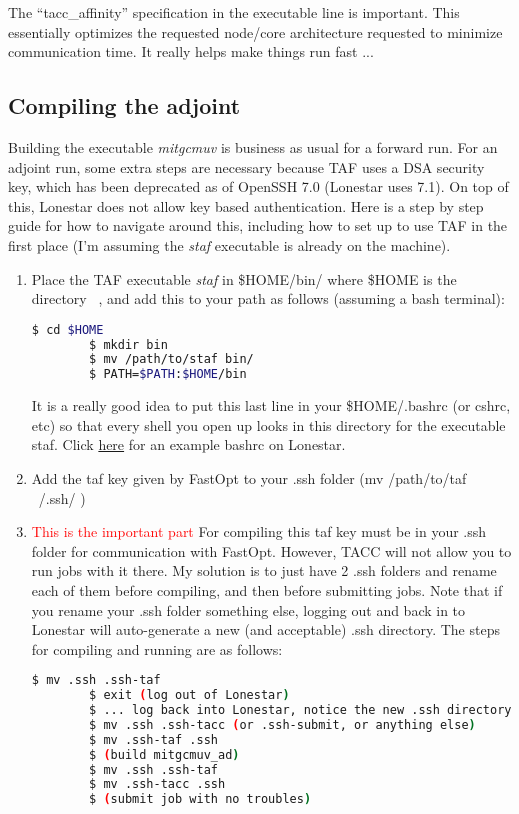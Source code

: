 \documentclass[a4paper,11pt]{article}
\newcommand{\red}[1]{\textcolor{red}{#1}}
\begin{document}
	The ``tacc\_affinity'' specification in the executable line is important. This essentially optimizes the requested node/core architecture requested to minimize communication time. It really helps make things run fast ...

	\subsection{Compiling the adjoint} 
	Building the executable \textit{mitgcmuv} is business as usual for a forward run. For an adjoint run, some extra steps are necessary because TAF uses a DSA security key, which has been deprecated as of OpenSSH 7.0 (Lonestar uses 7.1). On top of this, Lonestar does not allow key based authentication. Here is a step by step guide for how to navigate around this, including how to set up to use TAF in the first place (I'm assuming the \textit{staf} executable is already on the machine). 


	\begin{enumerate}
	  \item Place the TAF executable \textit{staf} in \$HOME/bin/ where \$HOME is the directory ~, and add this to your path as follows (assuming a bash terminal): 

	  \begin{lstlisting}[language=bash]
		$ cd $HOME
		$ mkdir bin
		$ mv /path/to/staf bin/
	 	$ PATH=$PATH:$HOME/bin
	  \end{lstlisting}

	It is a really good idea to put this last line in your \$HOME/.bashrc (or cshrc, etc) so that every shell you open up looks in this directory for the executable staf. Click \href{http://users.ices.utexas.edu/~tsmith/bash-scripts/bashrc_tsmith_lonestar}{here} for an example bashrc on Lonestar.

	\item Add the taf key given by FastOpt to your .ssh folder (mv /path/to/taf ~/.ssh/ )
	\item \red{This is the important part} For compiling this taf key must be in your .ssh folder for communication with FastOpt. However, TACC will not allow you to run jobs with it there. My solution is to just have 2 .ssh folders and rename each of them before compiling, and then before submitting jobs. Note that if you rename your .ssh folder something else, logging out and back in to Lonestar will auto-generate a new (and acceptable) .ssh directory. The steps for compiling and running are as follows:  

	  \begin{lstlisting}[language=bash]
		$ mv .ssh .ssh-taf
		$ exit (log out of Lonestar) 
		$ ... log back into Lonestar, notice the new .ssh directory
		$ mv .ssh .ssh-tacc (or .ssh-submit, or anything else) 
		$ mv .ssh-taf .ssh
		$ (build mitgcmuv_ad) 
		$ mv .ssh .ssh-taf 
		$ mv .ssh-tacc .ssh
		$ (submit job with no troubles) 

	  \end{lstlisting} 

	\end{enumerate}
	
\end{document}
